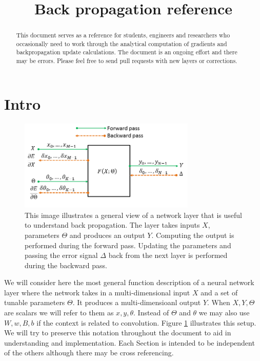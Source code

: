 \documentclass[a4paper]{article}
\title{Back propagation reference}
\begin{document}
\maketitle

\begin{abstract}
This document serves as a reference for students, engineers and researchers who occasionally need to work through the analytical computation of gradients and backpropagation update calculations. The document is an ongoing effort and there may be errors. Please feel free to send pull requests with new layers or corrections.
\end{abstract}

\tableofcontents
\newpage
\section{Intro}
\begin{figure}\label{fig:general}
\centering
\includegraphics[width=0.75\textwidth]{ForwardBackward.png}
\caption{This image illustrates a general view of a network layer that is useful to understand back propagation. The layer takes inputs $X$, parameters $\Theta$ and produces an output $Y$. Computing the output is performed during the forward pass. Updating the parameters and passing the error signal $\Delta$ back from the next layer is performed during the backward pass.}
\end{figure}
We will consider here the most general function description of a neural network layer where the network takes in a multi-dimensional input $X$ and a set of tunable parameters $\Theta$. It produces a multi-dimensioanl output $Y$. When $X,Y,\Theta$ are scalars we will refer to them as $x,y,\theta$. Instead of $\Theta$ and $\theta$ we may also use $W,w,B,b$ if the context is related to convolution. Figure \ref{fig:general} illustrates this setup. We will try to preserve this notation throughout the document to aid in understanding and implementation. Each Section is intended to be independent of the others although there may be cross referencing.
\newpage
%
\end{document}
